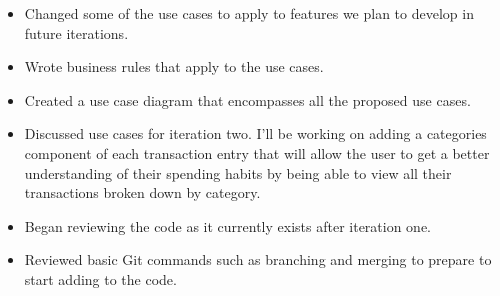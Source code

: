 \documentclass{article}
\begin{document}
	\begin{itemize}
		\item Changed some of the use cases to apply to features we plan to develop in 					future iterations.
		\item Wrote business rules that apply to the use cases.
		\item Created a use case diagram that encompasses all the proposed use cases.
	\end{itemize}
	
	\begin{itemize}
		\item Discussed use cases for iteration two. I'll be working on adding a 						categories component of each transaction entry that will allow the user to 					get a better understanding of their spending habits by being able to view 					all their transactions broken down by category. 
	\end{itemize}
	
	\begin{itemize}
		\item Began reviewing the code as it currently exists after iteration one.
		\item Reviewed basic Git commands such as branching and merging to prepare to 					start adding to the code. 
	\end{itemize}
	
\end{document}
